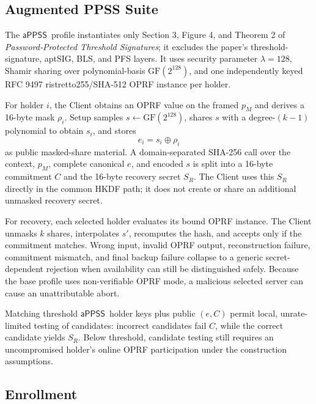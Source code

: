 \documentclass[sigconf,anonymous]{acmart}
\newcommand{\APPSS}{\ensuremath{\mathsf{aPPSS}}}
\begin{document}
\subsection{Augmented PPSS Suite}

The \APPSS\ profile instantiates only Section 3, Figure 4, and Theorem 2 of
\emph{Password-Protected Threshold Signatures}; it excludes the paper's
threshold-signature, aptSIG, BLS, and PFS layers. It uses security parameter
\(\lambda=128\), Shamir sharing over polynomial-basis
\(\mathrm{GF}(2^{128})\), and one independently keyed RFC 9497
ristretto255/SHA-512 OPRF instance per holder.

For holder \(i\), the Client obtains an OPRF value on the framed \(p_M\) and
derives a 16-byte mask \(\rho_i\). Setup samples
\(s\leftarrow\mathrm{GF}(2^{128})\), shares \(s\) with a degree-\((k-1)\)
polynomial to obtain \(s_i\), and stores
\[
  e_i=s_i\oplus\rho_i
\]
as public masked-share material. A domain-separated SHA-256 call over the
context, \(p_M\), complete canonical \(e\), and encoded \(s\) is split into a
16-byte commitment \(C\) and the 16-byte recovery secret \(S_R\). The Client
uses this \(S_R\) directly in the common HKDF path; it does not create or share
an additional unmasked recovery secret.

For recovery, each selected holder evaluates its bound OPRF instance. The
Client unmasks \(k\) shares, interpolates \(s'\), recomputes the hash, and
accepts only if the commitment matches. Wrong input, invalid OPRF output,
reconstruction failure, commitment mismatch, and final backup failure collapse
to a generic secret-dependent rejection when availability can still be
distinguished safely. Because the base profile uses non-verifiable OPRF mode,
a malicious selected server can cause an unattributable abort.

Matching threshold \APPSS\ holder keys plus public \((e,C)\) permit local,
unrate-limited testing of candidates: incorrect candidates fail \(C\), while
the correct candidate yields \(S_R\). Below threshold, candidate testing still
requires an uncompromised holder's online OPRF participation under the
construction assumptions.

\subsection{Enrollment}
\label{sec:enrollment}
\end{document}
